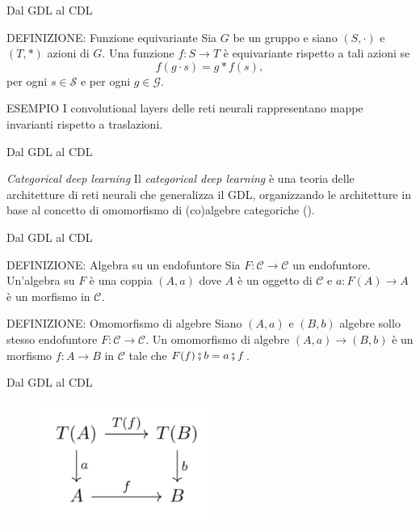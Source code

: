 \documentclass{beamer}
\begin{document}
\begin{frame}{Dal GDL al CDL}
    \begin{block}{DEFINIZIONE: Funzione equivariante}
        Sia $G$ be un gruppo e siano $(S, \cdot)$ e $(T, \ast)$ azioni di $G$. Una funzione $f: S \to T$ è equivariante rispetto a tali azioni se 
        \[f(g \cdot s) = g \ast f(s),\] 
        per ogni $s \in \mathcal{S}$ e per ogni $g \in \mathcal{G}$.
    \end{block}

    \begin{block}{ESEMPIO}
        I convolutional layers delle reti neurali rappresentano mappe invarianti rispetto a traslazioni.
    \end{block}
\end{frame}

\begin{frame}{Dal GDL al CDL}
    \begin{block}{\textit{Categorical deep learning}}
        Il \textit{categorical deep learning} è una teoria delle architetture di reti neurali che generalizza il GDL, organizzando le architetture in base al concetto di omomorfismo di (co)algebre categoriche (\cite{gavranovicposition}).
    \end{block}
\end{frame}

\begin{frame}{Dal GDL al CDL}
    \begin{block}{DEFINIZIONE: Algebra su un endofuntore}
        Sia $F: \mathcal{C} \to \mathcal{C}$ un endofuntore. Un'algebra su $F$ è una coppia $(A,a)$ dove $A$ è un oggetto di $\mathcal{C}$ e $a: F(A) \to A$ è un morfismo in $\mathcal{C}$.
    \end{block}

    \begin{block}{DEFINIZIONE: Omomorfismo di algebre}
        Siano $(A,a)$ e $(B,b)$ algebre sollo stesso endofuntore $F: \mathcal{C} \to \mathcal{C}$. Un omomorfismo di algebre $(A,a) \to (B,b)$ è un morfismo $f: A \to B$ in $\mathcal{C}$ tale che $F(f) \fatsemi b =  a \fatsemi f$.
    \end{block}
\end{frame}

\begin{frame}{Dal GDL al CDL}
    \begin{figure}
        \begin{center}
            \includegraphics[width=0.5\textwidth]{figures/algebra_hom.png}
            \caption*{}
        \end{center}
    \end{figure}
\end{frame}
\end{document}
